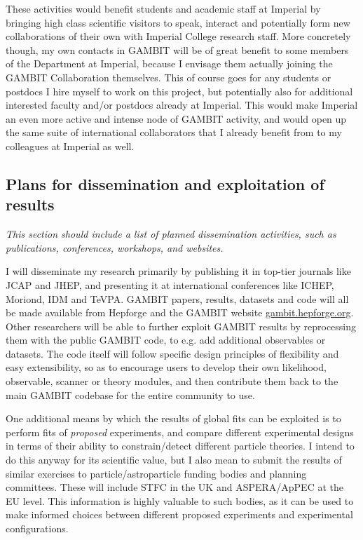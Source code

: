 \documentclass[a4paper,11pt]{article}
\newenvironment{xcomment}{\em}{}
\begin{document}
These activities would benefit students and academic staff at Imperial by bringing high class scientific visitors to speak, interact and potentially form new collaborations of their own with Imperial College research staff.  More concretely though, my own contacts in GAMBIT will be of great benefit to some members of the Department at Imperial, because I envisage them actually joining the GAMBIT Collaboration themselves.  This of course goes for any students or postdocs I hire myself to work on this project, but potentially also for additional interested faculty and/or postdocs already at Imperial.  This would make Imperial an even more active and intense node of GAMBIT activity, and would open up the same suite of international collaborators that I already benefit from to my colleagues at Imperial as well.

\subsection{Plans for dissemination and exploitation of results}

\begin{xcomment}
This section should include a list of planned dissemination
activities, such as publications, conferences, workshops, and
websites.
\end{xcomment}

I will disseminate my research primarily by publishing it in top-tier journals like JCAP and JHEP, and presenting it at international conferences like ICHEP, Moriond, IDM and TeVPA.  GAMBIT papers, results, datasets and code will all be made available from Hepforge and the GAMBIT website \href{http://gambit.hepforge.org}{gambit.hepforge.org}.  Other researchers will be able to further exploit GAMBIT results by reprocessing them with the public GAMBIT code, to e.g. add additional observables or datasets.  The code itself will follow specific design principles of flexibility and easy extensibility, so as to encourage users to develop their own likelihood, observable, scanner or theory modules, and then contribute them back to the main GAMBIT codebase for the entire community to use.  

One additional means by which the results of global fits can be exploited is to perform fits of \textit{proposed} experiments, and compare different experimental designs in terms of their ability to constrain/detect different particle theories.  I intend to do this anyway for its scientific value, but I also mean to submit the results of similar exercises to particle/astroparticle funding bodies and planning committees.  These will include STFC in the UK and ASPERA/ApPEC at the EU level. This information is highly valuable to such bodies, as it can be used to make informed choices between different proposed experiments and experimental configurations.
\end{document}
